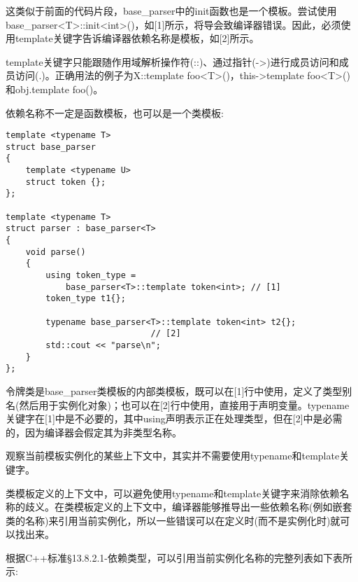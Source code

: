 这类似于前面的代码片段，base\_parser中的init函数也是一个模板。尝试使用base\_parser<T>::init<int>()，如[1]所示，将导会致编译器错误。因此，必须使用template关键字告诉编译器依赖名称是模板，如[2]所示。

template关键字只能跟随作用域解析操作符(::)、通过指针(->)进行成员访问和成员访问(.)。正确用法的例子为X::template foo<T>()，this->template foo<T>()和obj.template foo()。

依赖名称不一定是函数模板，也可以是一个类模板:

\begin{lstlisting}[style=styleCXX]
template <typename T>
struct base_parser
{
	template <typename U>
	struct token {};
};

template <typename T>
struct parser : base_parser<T>
{
	void parse()
	{
		using token_type =
			base_parser<T>::template token<int>; // [1]
		token_type t1{};
		
		typename base_parser<T>::template token<int> t2{};
		                     // [2]
		std::cout << "parse\n";
	}
};
\end{lstlisting}

令牌类是base\_parser类模板的内部类模板，既可以在[1]行中使用，定义了类型别名(然后用于实例化对象)；也可以在[2]行中使用，直接用于声明变量。typename关键字在[1]中是不必要的，其中using声明表示正在处理类型，但在[2]中是必需的，因为编译器会假定其为非类型名称。

观察当前模板实例化的某些上下文中，其实并不需要使用typename和template关键字。


类模板定义的上下文中，可以避免使用typename和template关键字来消除依赖名称的歧义。在类模板定义的上下文中，编译器能够推导出一些依赖名称(例如嵌套类的名称)来引用当前实例化，所以一些错误可以在定义时(而不是实例化时)就可以找出来。

根据C++标准§13.8.2.1-依赖类型，可以引用当前实例化名称的完整列表如下表所示:

